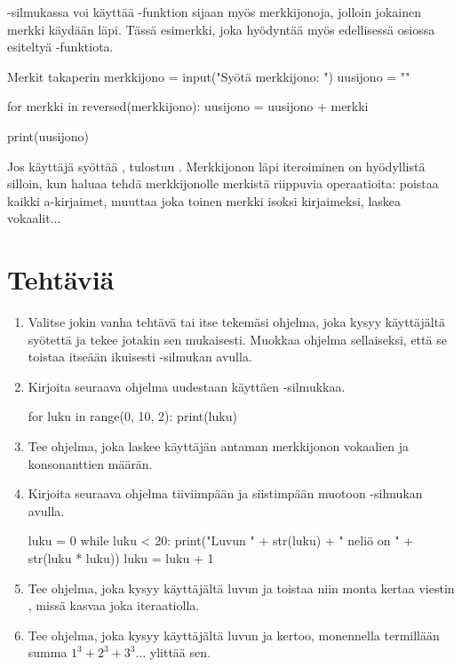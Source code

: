 -silmukassa voi käyttää -funktion sijaan myös merkkijonoja, jolloin jokainen merkki käydään läpi. Tässä esimerkki, joka hyödyntää myös edellisessä osiossa esiteltyä -funktiota.

\begin{example}{Merkit takaperin}
merkkijono = input("Syötä merkkijono: ")
uusijono = ""

for merkki in reversed(merkkijono):
	uusijono = uusijono + merkki

print(uusijono)
\end{example}

Jos käyttäjä syöttää , tulostuu . Merkkijonon läpi iteroiminen on hyödyllistä silloin, kun haluaa tehdä merkkijonolle merkistä riippuvia operaatioita: poistaa kaikki a-kirjaimet, muuttaa joka toinen merkki isoksi kirjaimeksi, laskea vokaalit...

\section{Tehtäviä}

\begin{enumerate}[\thesection .1]

\item Valitse jokin vanha tehtävä tai itse tekemäsi ohjelma, joka kysyy käyttäjältä syötettä ja tekee jotakin sen mukaisesti. Muokkaa ohjelma sellaiseksi, että se toistaa itseään ikuisesti -silmukan avulla.

\item Kirjoita seuraava ohjelma uudestaan käyttäen -silmukkaa.

\begin{python}
for luku in range(0, 10, 2):
	print(luku)
\end{python}

\item Tee ohjelma, joka laskee käyttäjän antaman merkkijonon vokaalien ja konsonanttien määrän.

\item Kirjoita seuraava ohjelma tiiviimpään ja siistimpään muotoon -silmukan avulla.

\begin{python}
luku = 0
while luku < 20:
	print("Luvun " + str(luku) + " neliö on " + str(luku * luku))
	luku = luku + 1 
\end{python}

\item Tee ohjelma, joka kysyy käyttäjältä luvun ja toistaa niin monta kertaa viestin , missä  kasvaa joka iteraatiolla.

\item Tee ohjelma, joka kysyy käyttäjältä luvun ja kertoo, monennella termillään summa $1^3 + 2^3 + 3^3 ...$ ylittää sen.

\end{enumerate}
